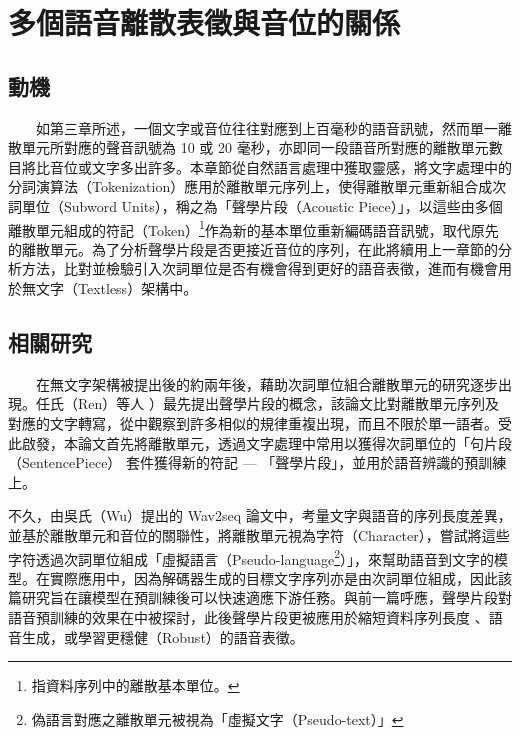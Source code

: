 
\chapter{多個語音離散表徵與音位的關係}   


\section{動機}

　　如第三章所述，一個文字或音位往往對應到上百毫秒的語音訊號，然而單一離散單元所對應的聲音訊號為 10 或 20 毫秒，亦即同一段語音所對應的離散單元數目將比音位或文字多出許多。本章節從自然語言處理中獲取靈感，將文字處理中的分詞演算法（Tokenization）應用於離散單元序列上，使得離散單元重新組合成次詞單位（Subword Units），稱之為「聲學片段（Acoustic Piece）」，以這些由多個離散單元組成的符記（Token）\footnote{指資料序列中的離散基本單位。}作為新的基本單位重新編碼語音訊號，取代原先的離散單元。為了分析聲學片段是否更接近音位的序列，在此將續用上一章節的分析方法，比對並檢驗引入次詞單位是否有機會得到更好的語音表徵，進而有機會用於無文字（Textless）架構\cite{lakhotia_generative_2021, lakhotia_generative_2021-1, noauthor_textless_2021}中。

\section{相關研究} 

　　在無文字架構被提出後的約兩年後，藉助次詞單位組合離散單元的研究逐步出現。任氏（Ren）等人 \cite{ren_speech_2022}）最先提出聲學片段的概念，該論文比對離散單元序列及對應的文字轉寫，從中觀察到許多相似的規律重複出現，而且不限於單一語者。受此啟發，本論文首先將離散單元，透過文字處理中常用以獲得次詞單位的「句片段（SentencePiece） \cite{kudo_sentencepiece_2018} 套件獲得新的符記 --- 「聲學片段」，並用於語音辨識的預訓練上。

        不久，由吳氏（Wu）提出的 Wav2seq \cite{wu_wav2seq_2023}論文中，考量文字與語音的序列長度差異，並基於離散單元和音位的關聯性，將離散單元視為字符（Character），嘗試將這些字符透過次詞單位組成「虛擬語言（Pseudo-language\footnote{偽語言對應之離散單元被視為「虛擬文字（Pseudo-text）」}）」，來幫助語音到文字的模型。在實際應用中，因為解碼器生成的目標文字序列亦是由次詞單位組成，因此該篇研究旨在讓模型在預訓練後可以快速適應下游任務。與前一篇呼應，聲學片段對語音預訓練的效果在\cite{10096788}中被探討，此後聲學片段更被應用於縮短資料序列長度\cite{chang_exploration_2023} 、語音生成\cite{shen2024acoustic}，或學習更穩健（Robust）的語音表徵\cite{chang2023r}。

